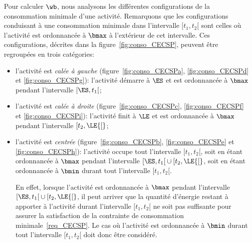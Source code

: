 Pour calculer $\wb$, nous analysons les différentes configurations de
la consommation minimale d'une activité. Remarquons que les
configurations conduisant à une consommation minimale dans
l'intervalle $[t_1,t_2{[}$ sont celles où l'activité est ordonnancée à
$\bmax$ à l'extérieur de cet intervalle. Ces configurations, décrites
dans la figure~\ref{fig:conso_CECSP}, peuvent être regroupées en trois
catégories:
\begin{itemize}
\item l'activité est {\it calée à
    gauche} (figure~\ref{fig:conso_CECSPa}, 
  \ref{fig:conso_CECSPd} et \ref{fig:conso_CECSPg}): l'activité démarre
  à $\ES$ et est ordonnancée à $\bmax$ pendant l'intervalle
  $[\ES,t_1{[}$;
\item l'activité est {\it calée à
    droite} (figure~\ref{fig:conso_CECSPc},
  \ref{fig:conso_CECSPf} et \ref{fig:conso_CECSPi}): l'activité finit à
  $\LE$ et est ordonnancée à $\bmax$ pendant l'intervalle $[t_2,\LE{[}$;
\item l'activité est {\it centrée} (figure~\ref{fig:conso_CECSPb}, \ref{fig:conso_CECSPe} et
  \ref{fig:conso_CECSPh}): l'activité occupe tout l'intervalle
  $[t_1,t_2[$, soit en étant ordonnancée à $\bmax$ pendant l'intervalle
  $[\ES,t_1{[} \cup [t_2,\LE{[}$, soit en étant ordonnancée à $\bmin$
  durant tout l'intervalle $[t_1,t_2{[}$.

  En effet, lorsque l'activité est ordonnancée à $\bmax$ pendant
  l'intervalle $[\ES,t_1{[} \cup [t_2,\LE{[}$, il peut arriver que la
  quantité d'énergie restant à apporter à l'activité durant l'intervalle
  $[t_1,t_2[$ ne soit pas suffisante pour assurer la satisfaction de la
  contrainte de consommation minimale~\eqref{req_CECSP}. Le cas où
  l'activité est ordonnancée à $\bmin$ durant tout l'intervalle
  $[t_1,t_2{[}$ doit donc être considéré.
\end{itemize}

